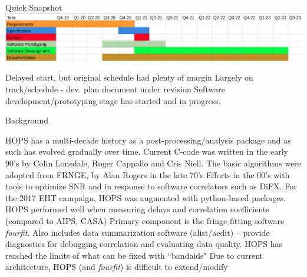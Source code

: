 \documentclass[8pt]{beamer}
\begin{document}

\begin{frame}{Quick Snapshot}
\centering
\includegraphics[width=\textwidth]{snapshot-schedule.png}
\begin{outline}
    \1 Delayed start, but original schedule had plenty of margin
    \1 Largely on track/schedule - dev. plan document under revision
    \1 Software development/prototyping stage has started and in progress.
\end{outline}
    
\end{frame}

\begin{frame}{Background}
    
    \begin{outline}
      \1 HOPS has a multi-decade history as a post-processing/analysis package and as such has evolved gradually over time.
        \2 Current C-code was written in the early 90’s by Colin Lonsdale, Roger Cappallo and Cris Niell. The basic algorithms were adopted from FRNGE, by Alan Rogers in the late 70's
        \2 Efforts in the 00's with tools to optimize SNR and in response to software correlators such as DiFX.
        \2 For the 2017 EHT campaign, HOPS was augmented with python-based packages. HOPS performed well when measuring delays and correlation coefficients (compared to AIPS, CASA)
      \1 Primary component is the fringe-fitting software \textit{fourfit}.
      \1 Also includes data summarization software (alist/aedit) -- provide diagnostics for debugging correlation and evaluating data quality.
      \1 HOPS has reached the limits of what can be fixed with ``bandaids"
      \1 Due to current architecture, HOPS (and \textit{fourfit}) is difficult to extend/modify
    \end{outline}
    
\end{frame}
\end{document}
